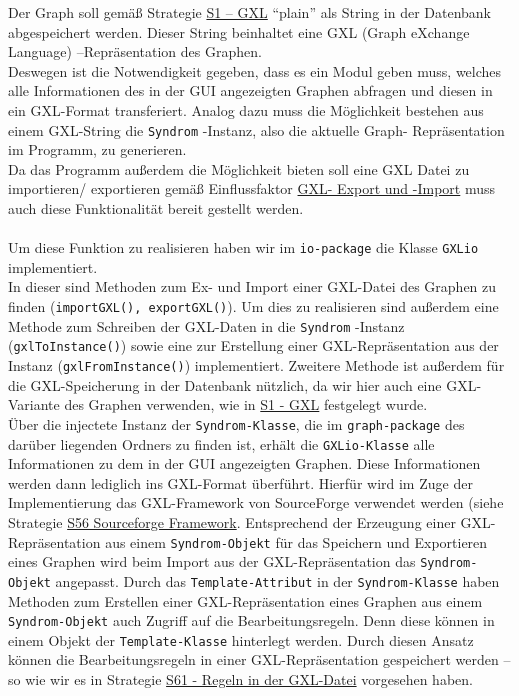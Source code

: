 \documentclass[enabledeprecatedfontcommands,fontsize=11pt,paper=a4,twoside]{scrartcl}
\newcounter{one}
\begin{document}
Der Graph soll gemäß Strategie \hyperlink{yy}{S1 – GXL} "`plain"' als String in der Datenbank abgespeichert werden. Dieser String beinhaltet eine GXL (Graph eXchange Language) –Repräsentation des Graphen.\\
Deswegen ist die Notwendigkeit gegeben, dass es ein Modul geben muss, welches alle Informationen des in der GUI angezeigten Graphen abfragen und diesen in ein GXL-Format transferiert. Analog dazu muss die Möglichkeit bestehen aus einem GXL-String die \texttt{Syndrom} -Instanz, also die aktuelle Graph- Repräsentation im Programm,  zu generieren. \\
Da das Programm außerdem die Möglichkeit bieten soll eine GXL Datei zu importieren/ exportieren gemäß Einflussfaktor \hyperlink{ii}{GXL- Export und -Import} muss auch diese Funktionalität bereit gestellt werden.\\ \\ 



 Um diese Funktion zu realisieren haben wir im \texttt{io-package} die Klasse \texttt{GXLio} implementiert. \\
In dieser sind Methoden zum Ex- und Import einer GXL-Datei des Graphen zu finden (\texttt{importGXL(), exportGXL()}). Um dies zu realisieren sind außerdem eine Methode zum Schreiben der GXL-Daten in die \texttt{Syndrom} -Instanz (\texttt{gxlToInstance()}) sowie eine zur Erstellung einer GXL-Repräsentation aus der Instanz (\texttt{gxlFromInstance()}) implementiert. Zweitere Methode ist außerdem für die GXL-Speicherung in der Datenbank nützlich, da wir hier auch eine GXL-Variante des Graphen verwenden, wie in \hyperlink{yy}{S1 - GXL} festgelegt wurde.\\
Über die injectete Instanz der \texttt{Syndrom-Klasse}, die im \texttt{graph-package} des darüber liegenden Ordners zu finden ist, erhält die \texttt{GXLio-Klasse} alle Informationen zu dem in der GUI angezeigten Graphen. 
Diese Informationen werden dann lediglich ins GXL-Format überführt. Hierfür wird im Zuge der Implementierung das GXL-Framework von SourceForge verwendet werden (siehe Strategie \hyperlink{xaa}{S56 Sourceforge Framework}. Entsprechend der Erzeugung einer GXL-Repräsentation aus einem \texttt{Syndrom-Objekt} für das Speichern und Exportieren eines Graphen wird beim Import aus der GXL-Repräsentation das \texttt{Syndrom-Objekt} angepasst. Durch das \texttt{Template-Attribut} in der \texttt{Syndrom-Klasse} haben Methoden zum Erstellen einer GXL-Repräsentation eines Graphen aus einem \texttt{Syndrom-Objekt} auch Zugriff auf die Bearbeitungsregeln. Denn diese können in einem Objekt der \texttt{Template-Klasse} hinterlegt werden. Durch diesen Ansatz können die Bearbeitungsregeln in einer GXL-Repräsentation gespeichert werden – so wie wir es in Strategie \hyperlink{vvv}{S61 - Regeln in der GXL-Datei} vorgesehen haben. \\ \\
\end{document}
